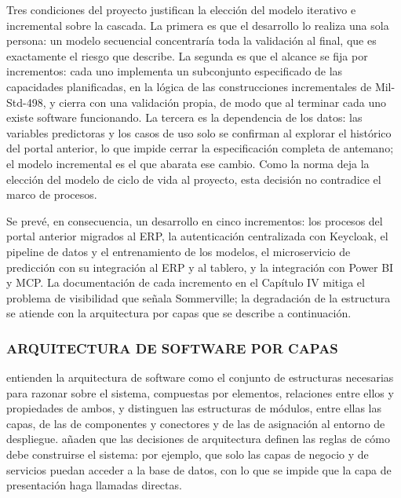Tres condiciones del proyecto justifican la elección del modelo iterativo e incremental sobre la cascada. La primera es que el desarrollo lo realiza una sola persona: un modelo secuencial concentraría toda la validación al final, que es exactamente el riesgo que \textcite{Royce1970} describe. La segunda es que el alcance se fija por incrementos: cada uno implementa un subconjunto especificado de las capacidades planificadas, en la lógica de las construcciones incrementales de Mil-Std-498, y cierra con una validación propia, de modo que al terminar cada uno existe software funcionando. La tercera es la dependencia de los datos: las variables predictoras y los casos de uso solo se confirman al explorar el histórico del portal anterior, lo que impide cerrar la especificación completa de antemano; el modelo incremental es el que abarata ese cambio. Como la norma \textcite{ISO12207-2017} deja la elección del modelo de ciclo de vida al proyecto, esta decisión no contradice el marco de procesos.

Se prevé, en consecuencia, un desarrollo en cinco incrementos: los procesos del portal anterior migrados al ERP, la autenticación centralizada con Keycloak, el pipeline de datos y el entrenamiento de los modelos, el microservicio de predicción con su integración al ERP y al tablero, y la integración con Power BI y MCP\@. La documentación de cada incremento en el Capítulo IV mitiga el problema de visibilidad que señala Sommerville; la degradación de la estructura se atiende con la arquitectura por capas que se describe a continuación.

\subsubsection{ARQUITECTURA DE SOFTWARE POR CAPAS}

\textcite{Bass2021} entienden la arquitectura de software como el conjunto de estructuras necesarias para razonar sobre el sistema, compuestas por elementos, relaciones entre ellos y propiedades de ambos, y distinguen las estructuras de módulos, entre ellas las capas, de las de componentes y conectores y de las de asignación al entorno de despliegue. \textcite{Richards2020} añaden que las decisiones de arquitectura definen las reglas de cómo debe construirse el sistema: por ejemplo, que solo las capas de negocio y de servicios puedan acceder a la base de datos, con lo que se impide que la capa de presentación haga llamadas directas.

